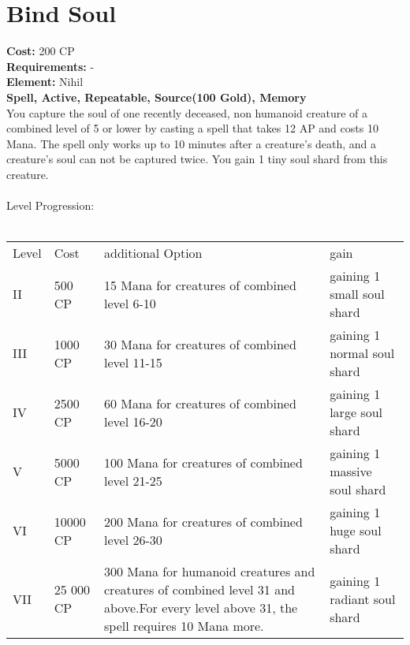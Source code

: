 \section{Bind Soul}
\textbf{Cost:} 200 CP\\
\textbf{Requirements:} -\\
\textbf{Element:} Nihil\\
\textbf{Spell, Active, Repeatable, Source(100 Gold), Memory}\\
You capture the soul of one recently deceased, non humanoid creature of a combined level of 5 or lower by casting a spell that takes 12 AP and costs 10 Mana. The spell only works up to 10 minutes after a creature’s death, and a creature’s soul can not be captured twice. You gain 1 tiny soul shard from this creature.\\
\\
Level Progression:\\
\\
\begin{tabular}{l | l | p{5.5cm} | p{2.5cm}}
    Level & Cost & additional Option & gain\\
    II & 500 CP & 15 Mana for creatures of combined level 6-10 & gaining 1 small soul shard\\
    III & 1000 CP & 30 Mana for creatures of combined level 11-15 & gaining 1 normal soul shard\\
    IV & 2500 CP & 60 Mana for creatures of combined level 16-20 & gaining 1 large soul shard\\
    V & 5000 CP & 100 Mana for creatures of combined level 21-25 & gaining 1 massive soul shard\\
    VI & 10000 CP & 200 Mana for creatures of combined level 26-30 & gaining 1 huge soul shard\\
    VII & 25 000 CP & 300 Mana for humanoid creatures and creatures of combined level 31 and above.\linebreak For every level above 31, the spell requires 10 Mana more. & gaining 1 radiant soul shard\\
\end{tabular}
